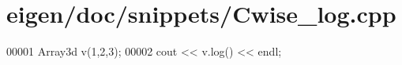 \hypertarget{eigen_2doc_2snippets_2_cwise__log_8cpp_source}{}\section{eigen/doc/snippets/\+Cwise\+\_\+log.cpp}
\label{eigen_2doc_2snippets_2_cwise__log_8cpp_source}

\begin{DoxyCode}
00001 Array3d v(1,2,3);
00002 cout << v.log() << endl;
\end{DoxyCode}
